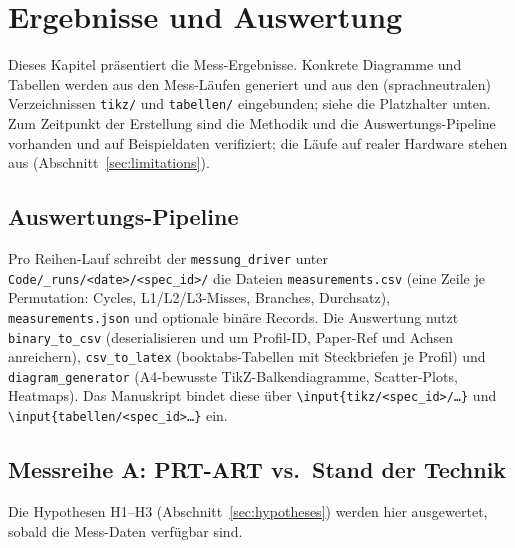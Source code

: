 \chapter{Ergebnisse und Auswertung}\label{ch:results}

Dieses Kapitel präsentiert die Mess-Ergebnisse. Konkrete Diagramme und Tabellen werden aus den
Mess-Läufen generiert und aus den (sprachneutralen) Verzeichnissen \texttt{tikz/} und
\texttt{tabellen/} eingebunden; siehe die Platzhalter unten. Zum Zeitpunkt der Erstellung sind die
Methodik und die Auswertungs-Pipeline vorhanden und auf Beispieldaten verifiziert; die Läufe auf
realer Hardware stehen aus (Abschnitt~\ref{sec:limitations}).

\section{Auswertungs-Pipeline}\label{sec:eval-pipeline}

Pro Reihen-Lauf schreibt der \texttt{messung\_driver} unter \texttt{Code/\_runs/<date>/<spec\_id>/}
die Dateien \texttt{measurements.csv} (eine Zeile je Permutation: Cycles, L1/L2/L3-Misses, Branches,
Durchsatz), \texttt{measurements.json} und optionale binäre Records. Die Auswertung nutzt
\texttt{binary\_to\_csv} (deserialisieren und um Profil-ID, Paper-Ref und Achsen anreichern),
\texttt{csv\_to\_latex} (booktabs-Tabellen mit Steckbriefen je Profil) und
\texttt{diagram\_generator} (A4-bewusste TikZ-Balkendiagramme, Scatter-Plots, Heatmaps). Das
Manuskript bindet diese über \texttt{\textbackslash{}input\{tikz/<spec\_id>/\ldots\}} und
\texttt{\textbackslash{}input\{tabellen/<spec\_id>\ldots\}} ein.

\section{Messreihe A\@: PRT-ART vs.\ Stand der Technik}\label{sec:result-a}

%   
%   
Die Hypothesen H1--H3 (Abschnitt~\ref{sec:hypotheses}) werden hier ausgewertet, sobald die
Mess-Daten verfügbar sind.

